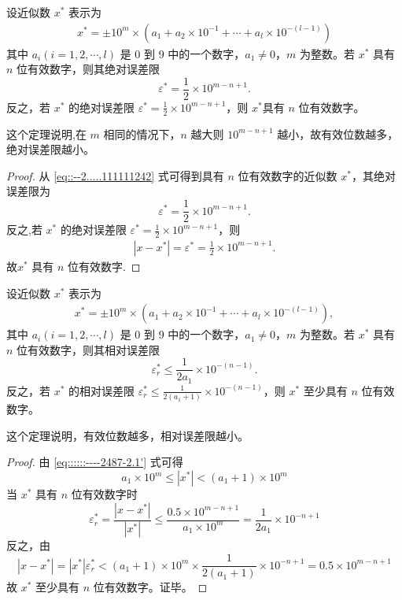 \documentclass[../../main.tex]{subfiles}
\begin{document}
\begin{theorem}
设近似数 $x^*$ 表示为 
\begin{align}
x^* = \pm 10^m \times (a_1 + a_2 \times 10^{-1} + \cdots + a_l \times 10^{-(l - 1)}) \label{eq::::::----2487-2.1'}
\end{align}
其中 $a_i (i = 1, 2, \cdots, l)$ 是 0 到 9 中的一个数字，$a_1 \neq 0$，$m$ 为整数。若 $x^*$ 具有 $n$ 位有效数字，则其绝对误差限
\[
\varepsilon^* = \frac{1}{2} \times 10^{m - n + 1}.
\]
反之，若 $x^*$ 的绝对误差限 $\varepsilon^* = \frac{1}{2} \times 10^{m - n + 1}$，则 $x^*$具有 $n$ 位有效数字。
\end{theorem}
\begin{note}
这个定理说明,在 $m$ 相同的情况下，$n$ 越大则 $10^{m - n + 1}$ 越小，故有效位数越多，绝对误差限越小。
\end{note}
\begin{proof}
从 \eqref{eq::--2.....111111242} 式可得到具有 $n$ 位有效数字的近似数 $x^*$，其绝对误差限为 
\[
\varepsilon^* = \frac{1}{2} \times 10^{m - n + 1}.
\]
反之,若 $x^*$ 的绝对误差限 $\varepsilon^* = \frac{1}{2} \times 10^{m - n + 1}$，则
\begin{align*}
|x-x^*|=\varepsilon^*=\frac{1}{2} \times 10^{m - n + 1}.
\end{align*}
故$x^*$ 具有 $n$ 位有效数字.

\end{proof}

\begin{theorem}
设近似数 $x^*$ 表示为
\begin{align*}
x^* = \pm 10^m \times (a_1 + a_2 \times 10^{-1} + \cdots + a_l \times 10^{-(l - 1)}), 
\end{align*}
其中 $a_i (i = 1, 2, \cdots, l)$ 是 0 到 9 中的一个数字，$a_1 \neq 0$，$m$ 为整数。若 $x^*$ 具有 $n$ 位有效数字，则其相对误差限 
\[
\varepsilon_r^* \leqslant \frac{1}{2a_1} \times 10^{-(n - 1)}.
\]
反之，若 $x^*$ 的相对误差限 $\varepsilon_r^* \leqslant \frac{1}{2(a_1 + 1)} \times 10^{-(n - 1)}$，则 $x^*$ 至少具有 $n$ 位有效数字。
\end{theorem}
\begin{note}
这个定理说明，有效位数越多，相对误差限越小。
\end{note}
\begin{proof}
由 \eqref{eq::::::----2487-2.1'} 式可得 
\[
a_1 \times 10^m \leqslant | x^* | < (a_1 + 1) \times 10^m
\]
当 $x^*$ 具有 $n$ 位有效数字时 
\[
\varepsilon_r^* = \frac{| x - x^* |}{| x^* |} \leqslant \frac{0.5 \times 10^{m - n + 1}}{a_1 \times 10^m} = \frac{1}{2a_1} \times 10^{-n + 1}
\]
反之，由 
\[
| x - x^* | = | x^* | \varepsilon_r^* < (a_1 + 1) \times 10^m \times \frac{1}{2(a_1 + 1)} \times 10^{-n + 1} = 0.5 \times 10^{m - n + 1}
\]
故 $x^*$ 至少具有 $n$ 位有效数字。证毕。

\end{proof}
\end{document}
